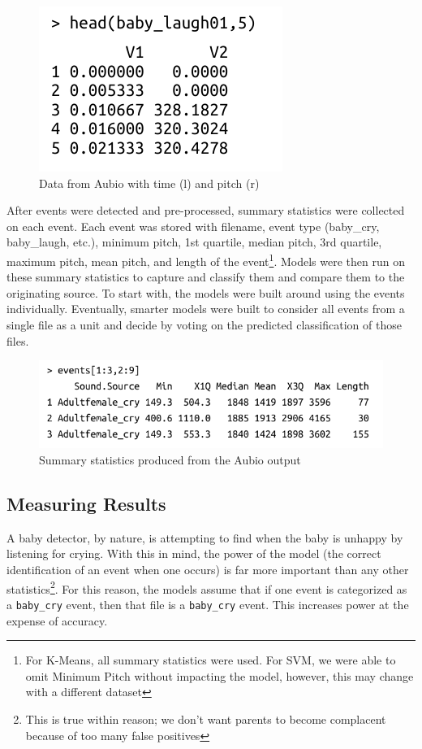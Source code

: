 \documentclass[paper=a4, fontsize=11pt]{scrartcl}
\numberwithin{equation}{section}
\numberwithin{figure}{section}
\numberwithin{table}{section}
\begin{document}
\begin{figure}
\begin{center}
\vspace{-15pt}
\includegraphics[width=.28\textwidth]{aubio_out.pdf}
\caption{Data from Aubio with time (l) and pitch (r)}\label{fig:headaubio}
\end{center}
\vspace{-20pt}
\end{figure}

After events were detected and pre-processed, summary statistics were collected on each event. Each event was stored with filename, event type (baby\_cry, baby\_laugh, etc.), minimum pitch, 1st quartile, median pitch, 3rd quartile, maximum pitch, mean pitch, and length of the event\footnote{For K-Means, all summary statistics were used. For SVM, we were able to omit Minimum Pitch without impacting the model, however, this may change with a different dataset}. Models were then run on these summary statistics to capture and classify them and compare them to the originating source. To start with, the models were built around using the events individually. Eventually, smarter models were built to consider all events from a single file as a unit and decide by voting on the predicted classification of those files.

\begin{figure}[H]
\begin{center}
\includegraphics[width=.65\textwidth]{aubio_events.pdf}
\caption{Summary statistics produced from the Aubio output}
\end{center}
\end{figure}

\subsection{Measuring Results}

A baby detector, by nature, is attempting to find when the baby is unhappy by listening for crying. With this in mind, the power of the model (the correct identification of an event when one occurs) is far more important than any other statistics\footnote{This is true within reason; we don't want parents to become complacent because of too many false positives}. For this reason, the models assume that if one event is categorized as a \texttt{baby\_cry} event, then that file is a \texttt{baby\_cry} event. This increases power at the expense of accuracy.
\end{document}
